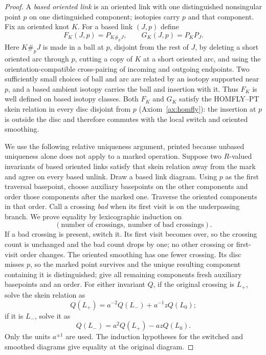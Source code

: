 \begin{proof}
A \emph{based oriented link} is an oriented link with one distinguished
nonsingular point $p$ on one distinguished component; isotopies carry $p$ and
that component. Fix an oriented knot $K$. For a based link $(J,p)$ define
\[
   F_K(J,p)=P_{K\#_pJ},\qquad G_K(J,p)=P_KP_J.
\]
Here $K\#_pJ$ is made in a ball at $p$, disjoint from the rest of $J$, by
deleting a short oriented arc through $p$, cutting a copy of $K$ at a short
oriented arc, and using the orientation-compatible cross-pairing of incoming
and outgoing endpoints. Two sufficiently small choices of ball and arc are
related by an isotopy supported near $p$, and a based ambient isotopy carries
the ball and insertion with it. Thus $F_K$ is well defined on based isotopy
classes. Both $F_K$ and $G_K$ satisfy the HOMFLY--PT skein relation in every
disc disjoint from $p$ (Axiom~\ref{ax:homfly}): the insertion at $p$ is outside
the disc and therefore commutes with the local switch and oriented smoothing.

We use the following relative uniqueness argument, printed because unbased
uniqueness alone does not apply to a marked operation. Suppose two $R$-valued
invariants of based oriented links satisfy that skein relation away from the
mark and agree on every based unlink. Draw a based link diagram. Using $p$ as
the first traversal basepoint, choose auxiliary basepoints on the other
components and order those components after the marked one. Traverse the
oriented components in that order. Call a crossing \emph{bad} when its first
visit is on the underpassing branch. We prove equality by lexicographic
induction on
\[
   (\text{number of crossings},\ \text{number of bad crossings}).
\]
If a bad crossing is present, switch it. Its first visit becomes over, so the
crossing count is unchanged and the bad count drops by one; no other crossing
or first-visit order changes. The oriented smoothing has one fewer crossing.
Its disc misses $p$, so the marked point survives and the unique resulting
component containing it is distinguished; give all remaining components fresh
auxiliary basepoints and an order. For either invariant $Q$, if the original
crossing is $L_+$, solve the skein relation as
\[
   Q(L_+)=a^{-2}Q(L_-)+a^{-1}zQ(L_0);
\]
if it is $L_-$, solve it as
\[
   Q(L_-)=a^2Q(L_+)-azQ(L_0).
\]
Only the units $a^{\pm1}$ are used. The induction hypotheses for the switched
and smoothed diagrams give equality at the original diagram.


\end{proof}
